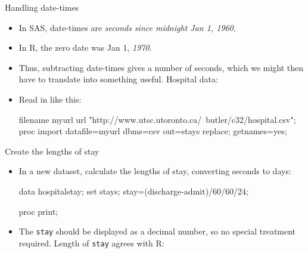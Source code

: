 \documentclass[unknownkeysallowed]{beamer}\usepackage[]{graphicx}\usepackage[]{color}
\begin{document}
\begin{frame}[fragile]{Handling date-times}
  
  \begin{itemize}
  \item In SAS, date-times are \emph{seconds since midnight Jan 1,
      1960}.
  \item In R, the zero date was Jan 1, \emph{1970}.
  \item Thus, subtracting date-times gives a number of seconds, which
    we might then have to translate into something useful. Hospital data:
    
    

    \item Read in like this:
    
    \begin{small}
\begin{Datastep}
filename myurl url 
  "http://www.utsc.utoronto.ca/~butler/c32/hospital.csv";  
proc import
  datafile=myurl
    dbms=csv
    out=stays
    replace;
  getnames=yes;
\end{Datastep}      
    \end{small}
    
     
    
  \end{itemize}
  
\end{frame}

\begin{frame}[fragile]{Create the lengths of stay}
  
  \begin{itemize}
  \item In a new dataset, calculate the lengths of stay, converting
    seconds to days:
   
    \begin{small}
    \begin{Datastep}
data hospitalstay;
  set stays;
  stay=(discharge-admit)/60/60/24;
    \end{Datastep}
    \end{small}

    \begin{Sascode}[store=dq]
proc print;          
    \end{Sascode}

      \item The \texttt{stay} should be displayed as a
    decimal number, so no special treatment required.
    Length of \texttt{stay} agrees with R:



  \end{itemize}
  
\end{frame}
\end{document}
